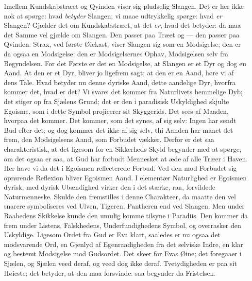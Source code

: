 \documentclass[12pt]{book}
\begin{document}
Imellem Kundskabstræet og Qvinden viser sig pludselig Slangen. Det
er her ikke nok at spørge: hvad \emph{betyder} Slangen; vi maae
udtrykkelig spørge: hvad \emph{er} Slangen? Gjælder det om
Kundskabstræet, at det \emph{er}, hvad det betyder: da maa det Samme
vel gjælde om Slangen. Den passer paa Træet og --- den passer paa
Qvinden. Strax, ved første Øiekast, viser Slangen sig som en
Modsigelse; den er da ogsaa en Modsigelse: den er Modsigelsernes
Ophav, Modsigelsen selv fra Begyndelsen. For det Første er det en
Modsigelse, at Slangen er et Dyr og dog en Aand. At den er et Dyr,
bliver jo ligefrem sagt; at den er en Aand, høre vi af dens Tale.
Hvad betyder nu denne dyriske Aand, dette aandelige Dyr, hvorfra
kommer det, hvad er det? Vi svare: det kommer fra Naturlivets
hemmelige Dyb; det stiger op fra Sjælens Grund; det er den i
paradisisk Uskyldighed skjulte Egoisme, som i dette Symbol
projicerer sit Skyggerids. Det sees af Maaden, hvorpaa det kommer.
Det kommer, som det synes, af sig selv: Ingen har sendt Bud efter
det; og dog kommer det ikke af sig selv, thi Aanden har manet det
frem, den Modsigelsens Aand, som Forbudet vækker. Derfor er det saa
charakteristisk, at det ligesom for en Sikkerheds Skyld begynder med
at spørge, om det ogsaa er saa, at Gud har forbudt Mennesket at æde
af alle Træer i Haven.
Her have vi da det i Egoismen reflecterede Forbud. Ved den mod
Forbudet sig oprørende Reflexion bliver Egoismen Aand. I elementær
Naturlighed er Egoismen dyrisk; med dyrisk Ubændighed virker den i
det stærke, raa, forvildede Naturmenneske. Skulde den fremstilles i
denne Charakteer, da maatte den vel snarere symboliseres ved Ulven,
Tigeren, Pantheren end ved Slangen. Men under Raahedens Skikkelse
kunde den umulig komme tilsyne i Paradiis. Den kommer da frem under
Listens, Falskhedens, Underfundighedens Symbol, og overrasker den
Uskyldige. Ligesom Ordet fra Gud er Eva klart, saaledes er nu ogsaa
det modsvarende Ord, en Gjenlyd af Egenraadigheden fra det selviske
Indre, en klar og bestemt Modsigelse mod Gudsordet. Det skeer for
Evas Øine; det foregaaer i Sjælen, og Sjælen veed deraf, og veed dog
ikke deraf. Tvetydigheden er paa sit Høieste; det betyder, at den
maa forsvinde: saa begynder da Fristelsen.
\end{document}
